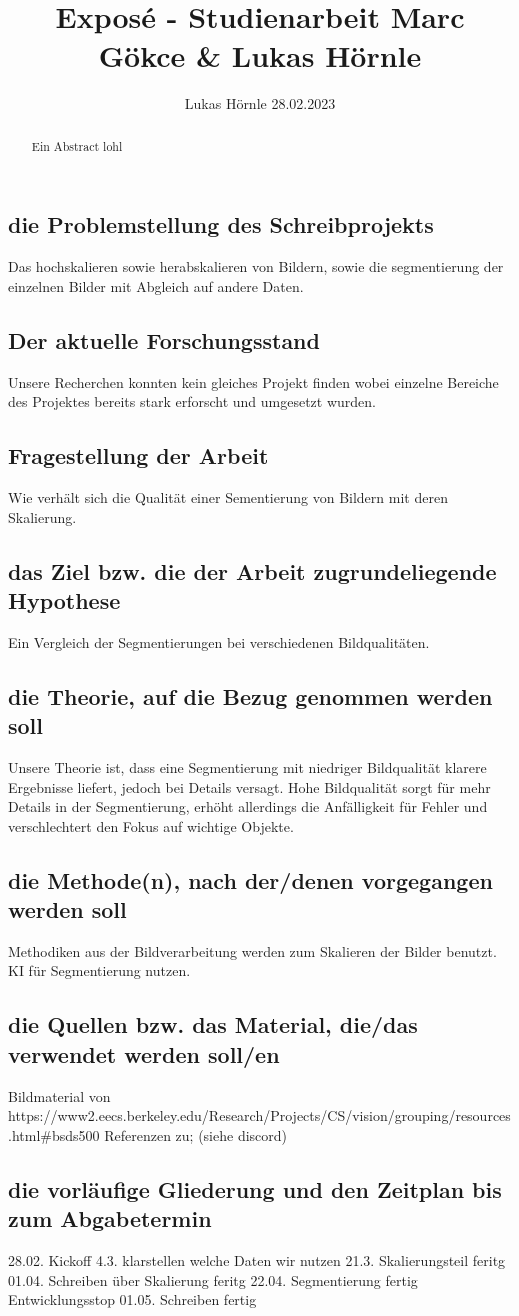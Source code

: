 \documentclass{article}
\title{Exposé - Studienarbeit Marc Gökce & Lukas Hörnle}
\author{Lukas Hörnle 28.02.2023}
\begin{document}
 \maketitle

 \begin{abstract}
  Ein Abstract lohl
 \end{abstract}

 \subsection{die Problemstellung des Schreibprojekts}
 Das hochskalieren sowie herabskalieren von Bildern, sowie die segmentierung der einzelnen Bilder mit Abgleich auf andere Daten.
 \subsection{Der aktuelle Forschungsstand}
 Unsere Recherchen konnten kein gleiches Projekt finden wobei einzelne Bereiche des Projektes bereits stark erforscht und umgesetzt wurden.
 \subsection{Fragestellung der Arbeit}
 Wie verhält sich die Qualität einer Sementierung von Bildern mit deren Skalierung.
 \subsection{das Ziel bzw. die der Arbeit zugrundeliegende Hypothese}
 Ein Vergleich der Segmentierungen bei verschiedenen Bildqualitäten.
 \subsection{die Theorie, auf die Bezug genommen werden soll}
 Unsere Theorie ist, dass eine Segmentierung mit niedriger Bildqualität klarere Ergebnisse liefert, jedoch bei Details versagt. Hohe Bildqualität sorgt für mehr Details in der Segmentierung, erhöht allerdings die Anfälligkeit für Fehler und verschlechtert den Fokus auf wichtige Objekte.
 \subsection{die Methode(n), nach der/denen vorgegangen werden soll}
 Methodiken aus der Bildverarbeitung werden zum Skalieren der Bilder benutzt.
 KI für Segmentierung nutzen.
 \subsection{die Quellen bzw. das Material, die/das verwendet werden soll/en}
 Bildmaterial von
 https://www2.eecs.berkeley.edu/Research/Projects/CS/vision/grouping/resources.html#bsds500
 Referenzen zu; (siehe discord)
 \subsection{die vorläufige Gliederung und den Zeitplan bis zum Abgabetermin}
 28.02. Kickoff
 4.3. klarstellen welche Daten wir nutzen
 21.3. Skalierungsteil feritg
 01.04. Schreiben über Skalierung feritg
 22.04. Segmentierung fertig Entwicklungsstop
 01.05. Schreiben fertig
\end{document}
